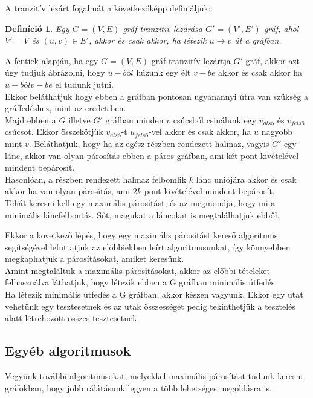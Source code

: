 \documentclass[12pt]{article}
\newtheorem{defin}{Definíció}[section]
\begin{document}
A tranzitív lezárt fogalmát a következőképp definiáljuk:

\begin{defin}
Egy $G = (V,E)$ gráf tranzitív lezárása $G' = (V',E')$ gráf, ahol $V' = V$ és $(u,v) \in E'$, akkor és csak akkor, ha létezik $u \rightarrow v$ út a gráfban.
\end{defin}

A fentiek alapján, ha egy $G = (V,E)$ gráf tranzitív lezártja $G'$ gráf, akkor azt úgy tudjuk ábrázolni, hogy $u-ból$ húzunk egy élt $v-be$ akkor és csak akkor ha $u-ból v-be$ el tudunk jutni.\\

Ekkor beláthatjuk hogy ebben a gráfban pontosan ugyanannyi útra van szükség a gráffedéshez, mint az eredetiben.\\
Majd ebben a $G$ illetve $G'$ gráfban minden $v$ csúcsból csinálunk egy $v_{alsó}$ és $v_{felső}$ csúcsot.
Ekkor összekötjük $v_{alsó}$-t $u_{felső}$-vel akkor és csak akkor, ha $u$ nagyobb mint $v$. Beláthatjuk, hogy ha az egész részben rendezett halmaz, vagyis $G'$ egy lánc, akkor van olyan párosítás ebben a páros gráfban, ami két pont kivételével mindent bepárosít.\\
Hasonlóan, a részben rendezett halmaz felbomlik $k$ lánc uniójára akkor és csak akkor ha van olyan párosítás, ami $2k$ pont kivételével mindent bepárosít.\\
Tehát keresni kell egy maximális párosítást, és az megmondja, hogy mi a minimális láncfelbontás. Sőt, magukat a láncokat is megtalálhatjuk ebből.

Ekkor a következő lépés, hogy egy maximális párosítást kereső algoritmus segítségével lefuttatjuk az előbbiekben leírt algoritmusunkat, így könnyebben megkaphatjuk a párosításokat, amiket keresünk.\\
Amint megtaláltuk a maximális párosításokat, akkor az előbbi tételeket felhasználva láthatjuk, hogy létezik ebben a G gráfban minimális útfedés.\\
Ha létezik minimális útfedés a G gráfban, akkor készen vagyunk. Ekkor egy utat vehetünk egy tesztesetnek és az utak összességét pedig tekinthetjük a tesztelés alatt létrehozott összes tesztesetnek.
\pagebreak

\subsection{Egyéb algoritmusok}

Vegyünk további algoritmusokat, melyekkel maximális párosítást tudunk keresni gráfokban, hogy jobb rálátásunk legyen a több lehetséges megoldásra is.\\
\end{document}
